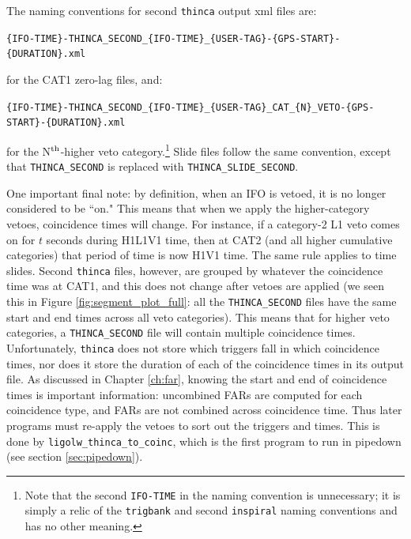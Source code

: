 The naming conventions for second \texttt{thinca} output xml files are:
\begin{center}
\footnotesize{\texttt{\{IFO-TIME\}-THINCA\_SECOND\_\{IFO-TIME\}\_\{USER-TAG\}-\{GPS-START\}-\{DURATION\}.xml}}
\end{center}
for the CAT1 zero-lag files, and:
\begin{center}
\footnotesize{\texttt{\{IFO-TIME\}-THINCA\_SECOND\_\{IFO-TIME\}\_\{USER-TAG\}\_CAT\_\{N\}\_VETO-\{GPS-START\}-\{DURATION\}.xml}}
\end{center}
for the N$^{\mathrm{th}}$-higher veto category.\footnote{Note that the second \texttt{IFO-TIME} in the naming convention is unnecessary; it is simply a relic of the \texttt{trigbank} and second \texttt{inspiral} naming conventions and has no other meaning.} Slide files follow the same convention, except that \texttt{THINCA\_SECOND} is replaced with \texttt{THINCA\_SLIDE\_SECOND}.

One important final note: by definition, when an \ac{IFO} is vetoed, it is no longer considered to be ``on." This means that when we apply the higher-category vetoes, coincidence times will change. For instance, if a category-2 L1 veto comes on for $t$ seconds during H1L1V1 time, then at CAT2 (and all higher cumulative categories) that period of time is now H1V1 time. The same rule applies to time slides. Second \texttt{thinca} files, however, are grouped by whatever the coincidence time was at CAT1, and this does not change after vetoes are applied (we seen this in Figure \ref{fig:segment_plot_full}: all the \texttt{THINCA\_SECOND} files have the same start and end times across all veto categories). This means that for higher veto categories, a \texttt{THINCA\_SECOND} file will contain multiple coincidence times. Unfortunately, \texttt{thinca} does not store which triggers fall in which coincidence times, nor does it store the duration of each of the coincidence times in its output file. As discussed in Chapter \ref{ch:far}, knowing the start and end of coincidence times is important information: uncombined \acp{FAR} are computed for each coincidence type, and \acp{FAR} are not combined across coincidence time. Thus later programs must re-apply the vetoes to sort out the triggers and times. This is done by \texttt{ligolw\_thinca\_to\_coinc}, which is the first program to run in pipedown (see section \ref{sec:pipedown}).

